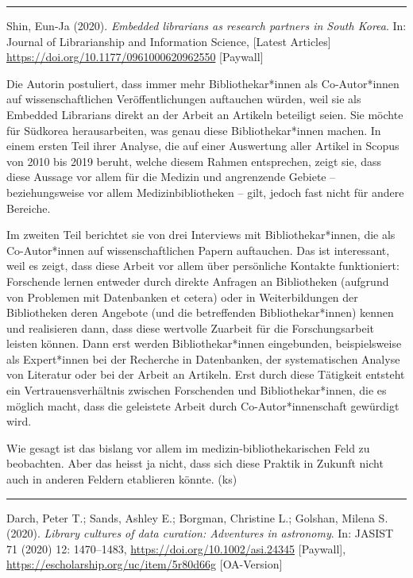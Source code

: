 \documentclass[a4paper,
fontsize=11pt,
oneside,
numbers=noperiodatend,
parskip=half-,
bibliography=totoc,
final
]{scrartcl}
\begin{document}
\begin{center}\rule{0.5\linewidth}{0.5pt}\end{center}

Shin, Eun-Ja (2020). \emph{Embedded librarians as research partners in
South Korea}. In: Journal of Librarianship and Information Science,
{[}Latest Articles{]} \url{https://doi.org/10.1177/0961000620962550}
{[}Paywall{]}

Die Autorin postuliert, dass immer mehr Bibliothekar*innen als
Co-Autor*innen auf wissenschaftlichen Veröffentlichungen auftauchen
würden, weil sie als Embedded Librarians direkt an der Arbeit an
Artikeln beteiligt seien. Sie möchte für Südkorea herausarbeiten, was
genau diese Bibliothekar*innen machen. In einem ersten Teil ihrer
Analyse, die auf einer Auswertung aller Artikel in Scopus von 2010 bis
2019 beruht, welche diesem Rahmen entsprechen, zeigt sie, dass diese
Aussage vor allem für die Medizin und angrenzende Gebiete --
beziehungsweise vor allem Medizinbibliotheken -- gilt, jedoch fast nicht
für andere Bereiche.

Im zweiten Teil berichtet sie von drei Interviews mit
Bibliothekar*innen, die als Co-Autor*innen auf wissenschaftlichen Papern
auftauchen. Das ist interessant, weil es zeigt, dass diese Arbeit vor
allem über persönliche Kontakte funktioniert: Forschende lernen entweder
durch direkte Anfragen an Bibliotheken (aufgrund von Problemen mit
Datenbanken et cetera) oder in Weiterbildungen der Bibliotheken deren
Angebote (und die betreffenden Bibliothekar*innen) kennen und
realisieren dann, dass diese wertvolle Zuarbeit für die Forschungsarbeit
leisten können. Dann erst werden Bibliothekar*innen eingebunden,
beispielsweise als Expert*innen bei der Recherche in Datenbanken, der
systematischen Analyse von Literatur oder bei der Arbeit an Artikeln.
Erst durch diese Tätigkeit entsteht ein Vertrauensverhältnis zwischen
Forschenden und Bibliothekar*innen, die es möglich macht, dass die
geleistete Arbeit durch Co-Autor*innenschaft gewürdigt wird.

Wie gesagt ist das bislang vor allem im medizin-bibliothekarischen Feld
zu beobachten. Aber das heisst ja nicht, dass sich diese Praktik in
Zukunft nicht auch in anderen Feldern etablieren könnte. (ks)

\begin{center}\rule{0.5\linewidth}{0.5pt}\end{center}

Darch, Peter T.; Sands, Ashley E.; Borgman, Christine L.; Golshan,
Milena S. (2020). \emph{Library cultures of data curation: Adventures in
astronomy}. In: JASIST 71 (2020) 12: 1470--1483,
\url{https://doi.org/10.1002/asi.24345} {[}Paywall{]},
\url{https://escholarship.org/uc/item/5r80d66g} {[}OA-Version{]}
\end{document}
